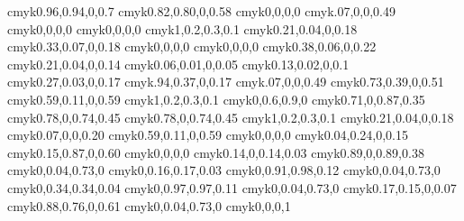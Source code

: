 \definecolor{firstpagetop@bg@color}		{cmyk}{0.96,0.94,0,0.7}
\definecolor{firstpagebottom@bg@color}	{cmyk}{0.82,0.80,0,0.58}
\definecolor{titledoc@color}				{cmyk}{0,0,0,0}
\definecolor{firstpage@lines@color}		{cmyk}{.07,0,0,0.49}
\definecolor{titleauthor@color}			{cmyk}{0,0,0,0}
\definecolor{titledate@color}			{cmyk}{0,0,0,0}
\definecolor{chapter@bg@color}			{cmyk}{1,0.2,0.3,0.1}
\definecolor{chapterdegrade@color}		{cmyk}{0.21,0.04,0,0.18}
\definecolor{chapterellipse@bg@color}	{cmyk}{0.33,0.07,0,0.18}
\definecolor{chapterellipse@color}		{cmyk}{0,0,0,0}
\definecolor{chaptertitlename@color}		{cmyk}{0,0,0,0}
\definecolor{chapterrule@color}			{cmyk}{0.38,0.06,0,0.22}
\definecolor{chaptermidcircle@color}		{cmyk}{0.21,0.04,0,0.14}
\definecolor{chapterbotcircle@color}		{cmyk}{0.06,0.01,0,0.05}
\definecolor{chaptertopcircle@color}		{cmyk}{0.13,0.02,0,0.1}
\definecolor{chapterline@color}			{cmyk}{0.27,0.03,0,0.17}
\definecolor{pagenumber@bg@color}		{cmyk}{.94,0.37,0,0.17}
\definecolor{shadow@color}				{cmyk}{.07,0,0,0.49}
\definecolor{chapterintro@color}			{cmyk}{0.73,0.39,0,0.51}
\definecolor{chapter@title@color}		{cmyk}{0.59,0.11,0,0.59}
\definecolor{section@title@color}		{cmyk}{1,0.2,0.3,0.1}
\definecolor{subsection@title@color}		{cmyk}{0,0.6,0.9,0}
\definecolor{subsubsection@title@color}	{cmyk}{0.71,0,0.87,0.35}
\definecolor{paragraph@title@color}		{cmyk}{0.78,0,0.74,0.45}
\definecolor{subparagraph@title@color}	{cmyk}{0.78,0,0.74,0.45}
\definecolor{arrayrule@color}			{cmyk}{1,0.2,0.3,0.1}
\definecolor{cell@color}					{cmyk}{0.21,0.04,0,0.18}
\definecolor{rem@bg@color}				{cmyk}{0.07,0,0,0.20}
\definecolor{remtitle@bg@color}			{cmyk}{0.59,0.11,0,0.59}
\definecolor{remtitle@color}				{cmyk}{0,0,0,0}
\definecolor{meth@bg@color}				{cmyk}{0.04,0.24,0,0.15}
\definecolor{methtitle@bg@color}			{cmyk}{0.15,0.87,0,0.60}
\definecolor{methtitle@color}			{cmyk}{0,0,0,0}
\definecolor{def@bg@color}				{cmyk}{0.14,0,0.14,0.03}
\definecolor{deftitle@bg@color}			{cmyk}{0.89,0,0.89,0.38}
\definecolor{deftitle@color}				{cmyk}{0,0.04,0.73,0}
\definecolor{prop@bg@color}				{cmyk}{0,0.16,0.17,0.03}
\definecolor{proptitle@bg@color}			{cmyk}{0,0.91,0.98,0.12}
\definecolor{proptitle@color}			{cmyk}{0,0.04,0.73,0}
\definecolor{thm@bg@color}				{cmyk}{0,0.34,0.34,0.04}
\definecolor{thmtitle@bg@color}			{cmyk}{0,0.97,0.97,0.11}
\definecolor{thmtitle@color}				{cmyk}{0,0.04,0.73,0}
\definecolor{ex@bg@color}				{cmyk}{0.17,0.15,0,0.07}
\definecolor{extitle@bg@color}			{cmyk}{0.88,0.76,0,0.61}
\definecolor{extitle@color}				{cmyk}{0,0.04,0.73,0}
\definecolor{dem@border@color}			{cmyk}{0,0,0,1}
